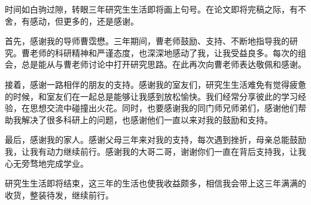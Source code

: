 

\begin{ack}

时间如白驹过隙，转眼三年研究生生活即将画上句号。在论文即将完稿之际，有不舍，有感动，但更多的，还是感谢。

首先，感谢我的导师曹霑懋。三年期间，曹老师鼓励、支持、不断地指导我的研究。曹老师的科研精神和严谨态度，也深深地感动了我，让我受益良多。每次的组会，总是能从与曹老师讨论中打开研究思路。在此再次向曹老师表达敬佩和感谢。

接着，感谢一路相伴的朋友的支持。感谢我的室友们，研究生生活难免有觉得疲惫的时候，和室友们在一起总是能够让我感到放松愉快。我们经常分享彼此的学习经验，在思想交流中碰撞出火花。同时，也要感谢我的同门师兄师弟们，感谢他们帮助我解决了很多科研上的问题，也感谢他们一直以来对我的鼓励和支持。

最后，感谢我的家人。感谢父母三年来对我的支持，每次遇到挫折，母亲总能鼓励我，让我有动力继续前行。感谢我的大哥二哥，谢谢你们一直在背后支持我，让我心无旁骛地完成学业。

研究生生活即将结束，这三年的生活也使我收益颇多，相信我会带上这三年满满的收货，整装待发，继续前行。

\end{ack}
